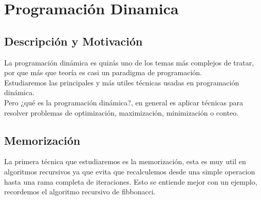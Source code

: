 \chapter{Programación Dinamica}
\section{Descripción y Motivación}

La programación dinámica es quizás uno de los temas más complejos de tratar, por que más que teoría es casi un paradigma de programación.
\\Estudiaremos las principales y más utiles técnicas usadas en programación dinámica.
\\Pero ¿qué es la programación dinámica?, en general es aplicar técnicas para resolver problemas de optimización, maximización, minimización o conteo.


\section{Memorización}
La primera técnica que estudiaremos es la memorización, esta es muy util en algoritmos recursivos ya que evita que recalculemos desde una simple operacion hasta una rama completa de iteraciones. Esto se entiende mejor con un ejemplo, recordemos el algoritmo recursivo de fibbonacci.